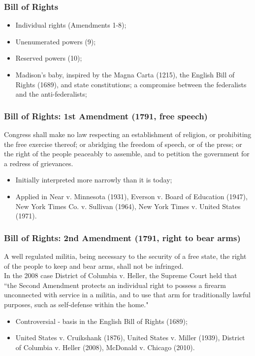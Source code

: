 \documentclass[aspectratio=169]{beamer}
\theoremstyle{principle}
\begin{document}
\begin{frame}
\frametitle{Bill of Rights}

\begin{itemize}
\item Individual rights (Amendments 1-8);
\bigskip
\bigskip
\item Unenumerated powers (9);
\bigskip
\bigskip
\item Reserved powers (10);
\bigskip
\bigskip
\item Madison's baby, inspired by the Magna Carta (1215), the English Bill of Rights (1689), and state constitutions; a compromise between the federalists and the anti-federalists;
\end{itemize}

\end{frame}

\begin{frame}
\frametitle{Bill of Rights: 1st Amendment (1791, free speech)}

Congress shall make no law respecting an establishment of religion, or prohibiting the free exercise thereof; or abridging the freedom of speech, or of the press; or the right of the people peaceably to assemble, and to petition the government for a redress of grievances.
\bigskip
\begin{itemize}
\item Initially interpreted more narrowly than it is today;
\item Applied in Near v. Minnesota (1931), Everson v. Board of Education (1947), New York Times Co. v. Sullivan (1964), New York Times v. United States (1971).
\end{itemize}
\end{frame}

\begin{frame}
\frametitle{Bill of Rights: 2nd Amendment (1791, right to bear arms)}
A well regulated militia, being necessary to the security of a free state, the right of the people to keep and bear arms, shall not be infringed.\\
\bigskip
In the 2008 case District of Columbia v. Heller, the Supreme Court held that ``the Second Amendment protects an individual right to possess a firearm unconnected with service in a militia, and to use that arm for traditionally lawful purposes, such as self-defense within the home."
\bigskip
\begin{itemize}
\item Controversial - basis in the English Bill of Rights (1689);
\item United States v. Cruikshank (1876), United States v. Miller (1939), District of Columbia v. Heller (2008), McDonald v. Chicago (2010).
\end{itemize}

\end{frame}
\end{document}
